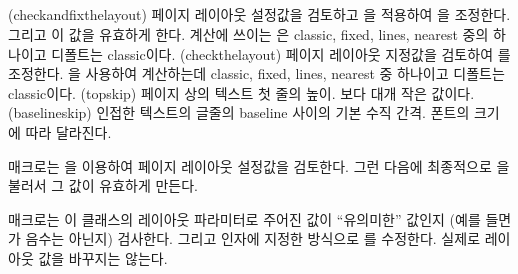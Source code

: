 \begin{syntax}
\cmd{\checkandfixthelayout} \\
\cmd{\checkthelayout} \\
\cmd{\fixthelayout} \\
\lnc{\baselineskip} \lnc{\topskip} \\
\end{syntax}
\glossary(checkandfixthelayout)%
  {}%
  {페이지 레이아웃 설정값을 검토하고 을
  적용하여 을 조정한다. 그리고 이 값을 유효하게 한다.
  계산에 쓰이는 은 classic, fixed, lines, nearest 중의 하나이고
  디폴트는 classic이다.}
\glossary(checkthelayout)%
  {}%
  {페이지 레이아웃 지정값을 검토하여 를
  조정한다. 을 사용하여 계산하는데 
  classic, fixed, lines, nearest 중 하나이고 디폴트는 classic이다.}
\glossary(topskip)%
  {}%
  {페이지 상의 텍스트 첫 줄의 높이. 보다
  대개 작은 값이다.}
\glossary(baselineskip)%
  {}%
  {인접한 텍스트의 글줄의 baseline 사이의 기본 수직 간격. 폰트의 크기에
  따라 달라진다.}

\cmd{\checkandfixthelayout} 매크로는 \cmd{\checkthelayout}을
이용하여 페이지 레이아웃 설정값을 검토한다. 그런 다음에 최종적으로
\cmd{\fixthelayout}을 불러서 그 값이 유효하게 만든다.

\cmd{\checkthelayout} 매크로는 이 클래스의 레이아웃 파라미터로
주어진 값이 “유의미한” 값인지 (예를 들면 \lnc{\textwidth}가 음수는 아닌지)
검사한다. 그리고  인자에 지정한 방식으로
\lnc{\textheight}를 수정한다. 실제로 레이아웃 값을 바꾸지는 않는다.

